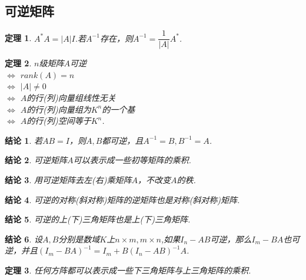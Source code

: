 \documentclass[UTF8]{article}
\newtheorem{thrm}{定理}[subsection]
\newtheorem{ccl}{结论}[subsection]
\begin{document}
\subsection{可逆矩阵}
\begin{thrm}
  $A^{*}A=
  |A|I$.若$A^{-1}$存在，则$A^{-1}=\dfrac{1}{|A|}A^{*}$.
\end{thrm}
\begin{thrm}
  $n$级矩阵$A$可逆\\ $\Longleftrightarrow$ $rank(A)=n$\\ $\Longleftrightarrow$ $|A|\ne 0$\\ $\Longleftrightarrow$ $A$的行(列)向量组线性无关\\
  $\Longleftrightarrow$ $A$的行(列)向量组为$K^n$的一个基\\ $\Longleftrightarrow$ $A$的行(列)空间等于$K^n$.
\end{thrm}
\begin{ccl}
  若$AB=I$，则$A,B$都可逆，且$A^{-1}=B,B^{-1}=A$.
\end{ccl}
\begin{ccl}
  可逆矩阵$A$可以表示成一些初等矩阵的乘积.
\end{ccl}
\begin{ccl}
  用可逆矩阵去左(右)乘矩阵$A$，不改变$A$的秩.
\end{ccl}
\begin{ccl}
  可逆的对称(斜对称)矩阵的逆矩阵也是对称(斜对称)矩阵.
\end{ccl}
\begin{ccl}
  可逆的上(下)三角矩阵也是上(下)三角矩阵.
\end{ccl}
\begin{ccl}
  设$A,B$分别是数域$K$上$n\times m,m\times n$,如果$I_n-AB$可逆，那么$I_m-BA$也可逆，并且$(I_m-BA)^{-1}=I_m+B(I_n-AB)^{-1}A$.
\end{ccl}
\begin{thrm}
  任何方阵都可以表示成一些下三角矩阵与上三角矩阵的乘积.
\end{thrm}
\end{document}
